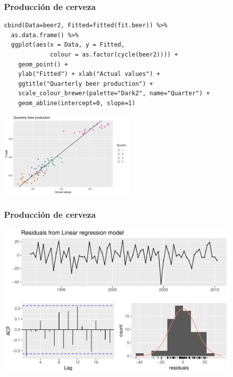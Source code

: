 \documentclass[10pt]{beamer}
\begin{document}





\begin{frame}[fragile]
\frametitle{Producción de cerveza}


\lstset{language=r,label= ,caption= ,captionpos=b,numbers=none}
\begin{lstlisting}
cbind(Data=beer2, Fitted=fitted(fit.beer)) %>%
  as.data.frame() %>%
  ggplot(aes(x = Data, y = Fitted,
             colour = as.factor(cycle(beer2)))) +
    geom_point() +
    ylab("Fitted") + xlab("Actual values") +
    ggtitle("Quarterly beer production") +
    scale_colour_brewer(palette="Dark2", name="Quarter") +
    geom_abline(intercept=0, slope=1)
\end{lstlisting}

\pause 
\begin{center}
\includegraphics[width=0.5\textwidth]{5-regression_files/figure-beamer/unnamed-chunk-7-1.pdf}
\end{center}


\end{frame}








\begin{frame}[fragile]
\frametitle{Producción de cerveza}


\begin{center}
\includegraphics[width=0.9\textwidth]{5-regression_files/figure-beamer/unnamed-chunk-8-1.pdf}
\end{center}


\end{frame}
\end{document}
